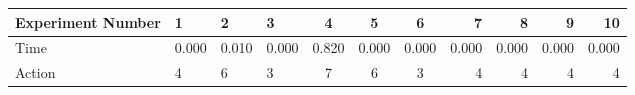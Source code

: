 \documentclass[8pt]{article}
\begin{document}
\begin{landscape}
\begin{tabular}{ | l | l | l | l | c | c | c | r | r | r | r | }
 \hline 
Experiment Number & 1 & 2 & 3 & 4 & 5 & 6 & 7 & 8 & 9 & 10\\ \hline
Time & 0.000 & 0.010 & 0.000 & 0.820 & 0.000 & 0.000 & 0.000 & 0.000 & 0.000 & 0.000\\ \hline
Action & 4 & 6 & 3 & 7 & 6 & 3 & 4 & 4 & 4 & 4\\ \hline\end{tabular}
\end{landscape}
\end{document}
